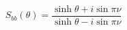 \begin{equation}
S_{bb}(\theta)=\frac{\sinh\theta+i\sin\pi\nu}{\sinh\theta-i\sin\pi\nu}
\label{2.1}%
\end{equation}

